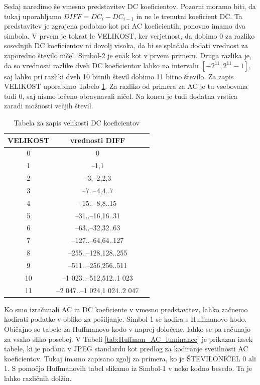 \documentclass[a4paper,12pt,openright]{book}
\begin{document}
Sedaj naredimo še vmesno predstavitev DC koeficientov. Pozorni moramo biti, da tukaj uporabljamo \(DIFF = DC_i - DC_{i-1}\) in ne le trenutni koeficient DC. Ta predstavitev je zgrajena podobno kot pri AC koeficientih, ponovno imamo dva simbola. V prvem je tokrat le VELIKOST, ker verjetnost, da dobimo 0 za razliko sosednjih DC koeficientov ni dovolj visoka, da bi se splačalo dodati vrednost za zaporedno število ničel. Simbol-2 je enak kot v prvem primeru. Druga razlika je, da so vrednosti razlike dveh DC koeficientov lahko na intervalu \(\left[-2^{11},2^{11}-1\right]\), saj lahko pri razliki dveh 10 bitnih števil dobimo 11 bitno število. Za zapis VELIKOST uporabimo Tabelo \ref{tab:Velikost_DC}. Za razliko od primera za AC je tu vsebovana tudi 0, saj nismo ločeno obravnavali ničel. Na koncu je tudi dodatna vrstica zaradi možnosti večjih števil.\par
\begin{table}[ht]
\centering
\begin{tabular}{|c|c|c|}
\hline
VELIKOST& vrednosti DIFF\\
\hline
 0& 0\\
 1& –1,1\\
 2& –3,–2,2,3\\
 3& –7..–4,4..7\\
 4& –15..–8,8..15\\
 5& –31..–16,16..31\\
 6& –63..–32,32..63\\
 7& –127..–64,64..127\\
 8& –255..–128,128..255\\
 9& –511..–256,256..511\\
10& –1 023..–512,512..1 023\\
11& –2 047..–1 024,1 024..2 047\\
\hline
\end{tabular}
\caption{Tabela za zapis velikosti DC koeficientov}
\label{tab:Velikost_DC}
\end{table}
Ko smo izračunali AC in DC koeficiente v vmesno predstavitev, lahko začnemo kodirati podatke v obliko za pošiljanje. Simbol-1 se kodira s Huffmanovo kodo. Običajno so tabele za Huffmanovo kodo v naprej določene, lahko se pa računajo za vsako sliko posebej. V Tabeli \ref{tab:Huffman_AC_luminance} je prikazan izsek tabele, ki je podana v JPEG standardu kot predlog za kodiranje svetilnosti AC koeficientov. Tukaj imamo zapisano zgolj za primera, ko je ŠTEVILONIČEL 0 ali 1. S pomočjo Huffmanovih tabel slikamo iz Simbol-1 v neko kodno besedo. Ta je lahko različnih dolžin. \par
\end{document}
